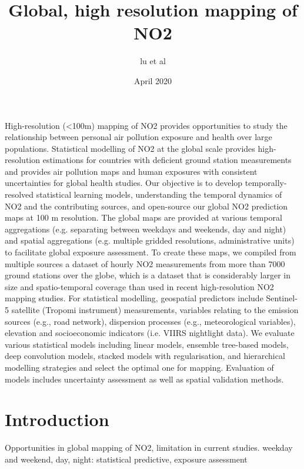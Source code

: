 \documentclass{article}
\title{Global, high resolution mapping of NO2}
\author{lu et al}
\date{April 2020}
\begin{document}
\maketitle

\abstract

High-resolution (<100m) mapping of NO2 provides opportunities to study the relationship between personal air pollution exposure and health over large populations. Statistical modelling of NO2 at the global scale provides high-resolution estimations for countries with deficient ground station measurements and provides air pollution maps and human exposures with consistent uncertainties for global health studies. Our objective is to develop temporally-resolved statistical learning models, understanding the temporal dynamics of NO2 and the contributing sources, and open-source our global NO2 prediction maps at 100 m resolution. The global maps are provided at various temporal aggregations (e.g. separating between weekdays and weekends, day and night) and spatial aggregations (e.g. multiple gridded resolutions, administrative units) to facilitate global exposure assessment. To create these maps, we compiled from multiple sources a dataset of hourly NO2 measurements from more than 7000 ground stations over the globe, which is a dataset that is considerably larger in size and spatio-temporal coverage than used in recent high-resolution NO2 mapping studies. For statistical modelling, geospatial predictors include Sentinel-5 satellite (Tropomi instrument) measurements, variables relating to the emission sources (e.g., road network), dispersion processes (e.g., meteorological variables), elevation and socioeconomic indicators (i.e. VIIRS nightlight data). We evaluate various statistical models including linear models, ensemble tree-based models, deep convolution models, stacked models with regularisation, and hierarchical modelling strategies and select the optimal one for mapping. Evaluation of models includes uncertainty assessment as well as spatial validation methods. 

\section{Introduction}
Opportunities in global mapping of NO2, limitation in current studies. 
weekday and weekend, day, night: statistical predictive, exposure assessment
\end{document}

